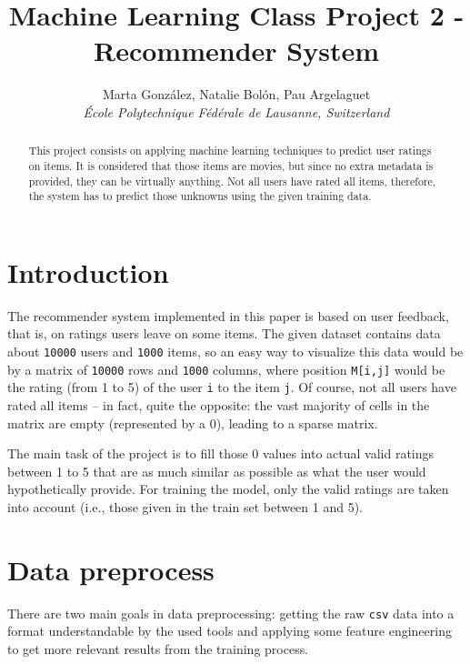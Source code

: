 \documentclass[11pt,conference]{IEEEtran}
\begin{document}
\title{\huge Machine Learning Class Project 2 - Recommender System}

\author{
  Marta González, Natalie Bolón, Pau Argelaguet\\
  \small \textit{École Polytechnique Fédérale de Lausanne, Switzerland}
}

\maketitle

\thispagestyle{plain}
\pagestyle{plain}

\begin{abstract}
This project consists on applying machine learning techniques to predict user ratings on items. It is considered that those items are movies, but since no extra metadata is provided, they can be virtually anything. Not all users have rated all items, therefore, the system has to predict those unknowns using the given training data.
\end{abstract}

\section{Introduction}
The recommender system implemented in this paper is based on user feedback, that is, on ratings users leave on some items. The given dataset contains data about \verb|10000| users and \verb|1000| items, so an easy way to visualize this data would be by a matrix of \verb|10000| rows and \verb|1000| columns, where position \verb|M[i,j]| would be the rating (from 1 to 5) of the user \verb|i| to the item \verb|j|. Of course, not all users have rated all items -- in fact, quite the opposite: the vast majority of cells in the matrix are empty (represented by a 0), leading to a sparse matrix.

The main task of the project is to fill those 0 values into actual valid ratings between 1 to 5 that are as much similar as possible as what the user would hypothetically provide. For training the model, only the valid ratings are taken into account (i.e., those given in the train set between 1 and 5).

\section{Data preprocess}

There are two main goals in data preprocessing: getting the raw \verb|csv| data into a format understandable by the used tools and applying some feature engineering to get more relevant results from the training process.
\end{document}
